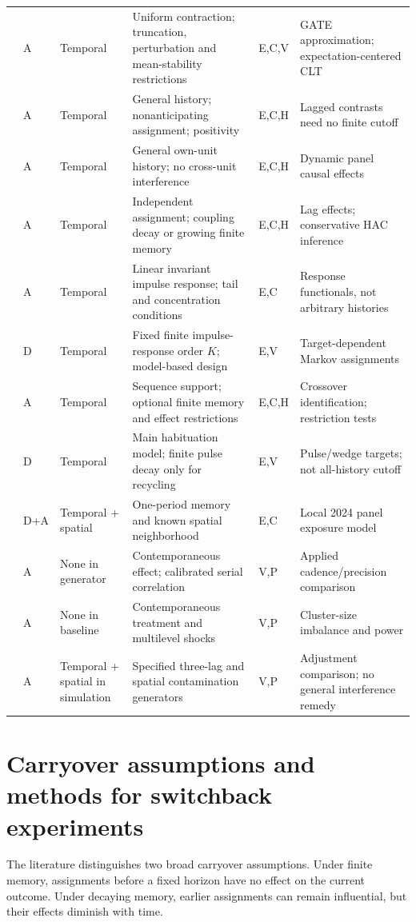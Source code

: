 \documentclass[12pt]{article}
\begin{document}
\begin{singlespace}
\begin{longtable}{P{3.2cm}P{0.9cm}P{1.8cm}P{4.5cm}P{1.3cm}P{3.3cm}}
\citet{johari2025} & A & Temporal & Uniform contraction; truncation, perturbation and mean-stability restrictions & E,C,V & GATE approximation; expectation-centered CLT\\
\citet{bojinovshephard2019} & A & Temporal & General history; nonanticipating assignment; positivity & E,C,H & Lagged contrasts need no finite cutoff\\
\citet{bojinovpanel2021} & A & Temporal & General own-unit history; no cross-unit interference & E,C,H & Dynamic panel causal effects\\
\citet{linding2025} & A & Temporal & Independent assignment; coupling decay or growing finite memory & E,C,H & Lag effects; conservative HAC inference\\
\citet{liangrecht2025} & A & Temporal & Linear invariant impulse response; tail and concentration conditions & E,C & Response functionals, not arbitrary histories\\
\citet{guoliang2026} & D & Temporal & Fixed finite impulse-response order $K$; model-based design & E,V & Target-dependent Markov assignments\\
\citet{jiangding2025} & A & Temporal & Sequence support; optional finite memory and effect restrictions & E,C,H & Crossover identification; restriction tests\\
\citet{basse2023} & D & Temporal & Main habituation model; finite pulse decay only for recycling & E,V & Pulse/wedge targets; not all-history cutoff\\
\citet{nipanel2024} & D+A & Temporal + spatial & One-period memory and known spatial neighborhood & E,C & Local 2024 panel exposure model\\
\citet{ferrari2026} & A & None in generator & Contemporaneous effect; calibrated serial correlation & V,P & Applied cadence/precision comparison\\
\citet{pankratev2026power} & A & None in baseline & Contemporaneous treatment and multilevel shocks & V,P & Cluster-size imbalance and power\\
\citet{pankratev2026variance} & A & Temporal + spatial in simulation & Specified three-lag and spatial contamination generators & V,P & Adjustment comparison; no general interference remedy\\
\end{longtable}
\endgroup
\end{singlespace}

\section{Carryover assumptions and methods for switchback experiments}\label{sec:carryover}
The literature distinguishes two broad carryover assumptions. Under finite memory, assignments before a fixed horizon have no effect on the current outcome. Under decaying memory, earlier assignments can remain influential, but their effects diminish with time.
\end{document}
